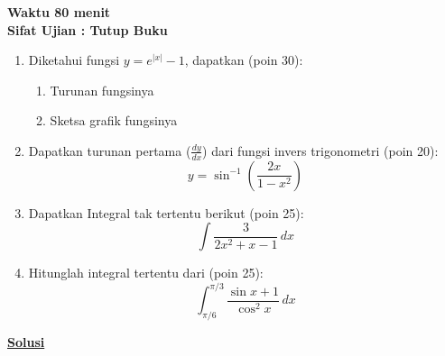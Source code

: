 ﻿\documentclass[a4paper,12pt]{article}
\begin{document}
\begin{center}
  \bfseries
  Waktu 80 menit \\
  Sifat Ujian : Tutup Buku\\
\end{center}

\begin{enumerate}
  \item Diketahui fungsi  $y= e^{|x|} - 1$, dapatkan (poin 30):
        \begin{enumerate}
          \item Turunan fungsinya
          \item Sketsa grafik fungsinya
        \end{enumerate}

  \item Dapatkan turunan pertama ($\frac{dy}{dx}$) dari fungsi invers trigonometri (poin 20):
        \[
          y = \sin^{-1}\left(\frac{2x}{1 - x^2}\right)
        \]

  \item Dapatkan Integral tak tertentu berikut (poin 25):
        \[
          \int \frac{3}{2x^2 + x - 1}\,dx
        \]

  \item Hitunglah integral tertentu dari (poin 25):
        \[
          \int_{\pi/6}^{\pi/3} \frac{\sin x + 1}{\cos^2 x}\,dx
        \]
\end{enumerate}

\begin{center}
  \textbf{\underline{Solusi}}
\end{center}
\end{document}
